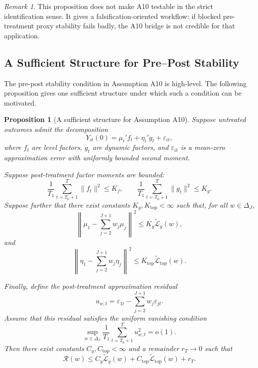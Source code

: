 \documentclass[11pt]{article}
\theoremstyle{plain}
\newtheorem{proposition}[proposition]{Proposition}
\theoremstyle{definition}
\theoremstyle{remark}
\newtheorem{remark}[remark]{Remark}
\newcommand{\1}{\mathbbm{1}}
\begin{document}
\begin{remark}
This proposition does not make A10 testable in the strict identification sense.
It gives a falsification-oriented workflow: if blocked pre-treatment proxy
stability fails badly, the A10 bridge is not credible for that application.
\end{remark}

\subsection{A Sufficient Structure for Pre--Post Stability}

The pre-post stability condition in Assumption A10 is high-level. The following
proposition gives one sufficient structure under which such a condition can be
motivated.

\begin{proposition}[A sufficient structure for Assumption A10]
\label{prop:prepost-structure}
Suppose untreated outcomes admit the decomposition
\[
Y_{it}(0)
=
\mu_i'f_t
+
\eta_i'g_t
+
\varepsilon_{it},
\]
where \(f_t\) are level factors, \(g_t\) are dynamic factors, and
\(\varepsilon_{it}\) is a mean-zero approximation error with uniformly bounded
second moment.

Suppose post-treatment factor moments are bounded:
\[
\frac{1}{T_1}
\sum_{t=T_0+1}^{T}
\|f_t\|^2
\le
K_f,
\qquad
\frac{1}{T_1}
\sum_{t=T_0+1}^{T}
\|g_t\|^2
\le
K_g.
\]
Suppose further that there exist constants \(K_y,K_{\mathrm{top}}<\infty\) such
that, for all \(w\in\Delta_J\),
\[
\left\|
\mu_1-\sum_{j=2}^{J+1}w_j\mu_j
\right\|^2
\le
K_y\widetilde{\mathcal L}_y(w),
\]
and
\[
\left\|
\eta_1-\sum_{j=2}^{J+1}w_j\eta_j
\right\|^2
\le
K_{\mathrm{top}}
\widetilde{\mathcal L}_{\mathrm{top}}(w).
\]

Finally, define the post-treatment approximation residual
\[
u_{w,t}
=
\varepsilon_{1t}
-
\sum_{j=2}^{J+1}w_j\varepsilon_{jt}.
\]
Assume that this residual satisfies the uniform vanishing condition
\[
\sup_{w\in\Delta_J}
\frac{1}{T_1}
\sum_{t=T_0+1}^{T}
u_{w,t}^2
=
o(1).
\]
Then there exist constants \(C_y,C_{\mathrm{top}}<\infty\) and a remainder
\(r_T\to0\) such that
\[
\mathcal R(w)
\le
C_y\widetilde{\mathcal L}_y(w)
+
C_{\mathrm{top}}\widetilde{\mathcal L}_{\mathrm{top}}(w)
+
r_T.
\]
\end{proposition}
\end{document}
